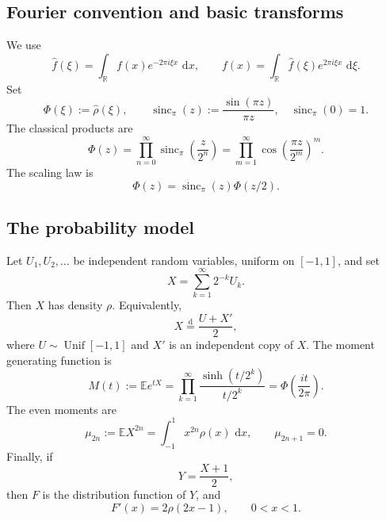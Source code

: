 \documentclass[11pt]{article}
\theoremstyle{definition}
\theoremstyle{remark}
\newcommand{\R}{\mathbb R}
\newcommand{\E}{\mathbb E}
\newcommand{\dd}{\,\mathrm d}
\newcommand{\sincpi}{\operatorname{sinc}_{\pi}}
\begin{document}
\subsection{Fourier convention and basic transforms}

We use
\begin{equation}
 \widehat f(\xi)=\int_{\R}f(x)e^{-2\pi i\xi x}\,\dd x,
 \qquad
 f(x)=\int_{\R}\widehat f(\xi)e^{2\pi i\xi x}\,\dd\xi.       \label{eq:fourier-convention}
\end{equation}
Set
\begin{equation}
 \Phi(\xi):=\widehat\rho(\xi),
 \qquad
 \sincpi(z):=\frac{\sin(\pi z)}{\pi z},\quad \sincpi(0)=1. \label{eq:Phi-def}
\end{equation}
The classical products are
\begin{equation}
 \Phi(z)=\prod_{n=0}^{\infty}\sincpi\!\left(\frac{z}{2^n}\right)
 =\prod_{m=1}^{\infty}\cos\!\left(\frac{\pi z}{2^m}\right)^m. \label{eq:Phi-products}
\end{equation}
The scaling law is
\begin{equation}
 \Phi(z)=\sincpi(z)\Phi(z/2).                                \label{eq:Phi-scaling}
\end{equation}

\subsection{The probability model}

Let \(U_1,U_2,\dots\) be independent random variables, uniform on \([-1,1]\), and set
\begin{equation}
 X=\sum_{k=1}^{\infty}2^{-k}U_k.                              \label{eq:X-series}
\end{equation}
Then \(X\) has density \(\rho\).  Equivalently,
\begin{equation}
 X\overset{\mathrm d}=\frac{U+X'}2,                           \label{eq:X-fixed-point}
\end{equation}
where \(U\sim\operatorname{Unif}[-1,1]\) and \(X'\) is an independent copy of \(X\).
The moment generating function is
\begin{equation}
 M(t):=\E e^{tX}
 =\prod_{k=1}^{\infty}\frac{\sinh(t/2^k)}{t/2^k}
 =\Phi\!\left(\frac{it}{2\pi}\right).                       \label{eq:M-product}
\end{equation}
The even moments are
\begin{equation}
 \mu_{2n}:=\E X^{2n}=\int_{-1}^{1}x^{2n}\rho(x)\,\dd x,
 \qquad \mu_{2n+1}=0.                                      \label{eq:moments}
\end{equation}
Finally, if
\begin{equation}
 Y=\frac{X+1}{2},                                             \label{eq:Y-affine}
\end{equation}
then \(F\) is the distribution function of \(Y\), and
\begin{equation}
 F'(x)=2\rho(2x-1),\qquad 0<x<1.                              \label{eq:F-density}
\end{equation}
\end{document}
